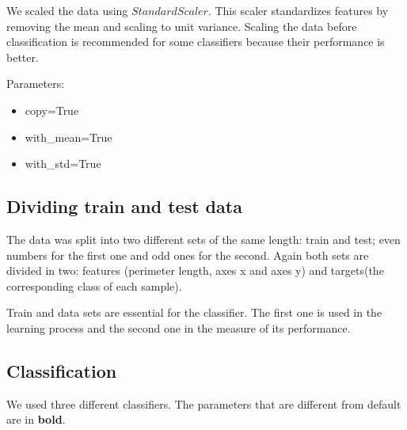 \documentclass{article} %
\begin{document}
We scaled the data using $StandardScaler$. This scaler standardizes features by removing the mean and scaling to unit variance. Scaling the data before classification is recommended for some classifiers because their performance is better.

Parameters:
\begin{multicols}{2}
\begin{itemize}
\item copy=True
\item with\_mean=True
\item with\_std=True
\end{itemize}
\end{multicols}

\subsection{Dividing train and test data}
 
The data was split into two different sets of the same length: train and test; even numbers for the first one and odd ones for the second. Again both sets are divided in two: features (perimeter length, axes x and axes y) and targets(the corresponding class of each sample). 

Train and data sets are essential for the classifier. The first one is used in the learning process and the second one in the measure of its performance.

\subsection{Classification}

We used three different classifiers. The parameters that are different from default are in \textbf{bold}.
\end{document}
